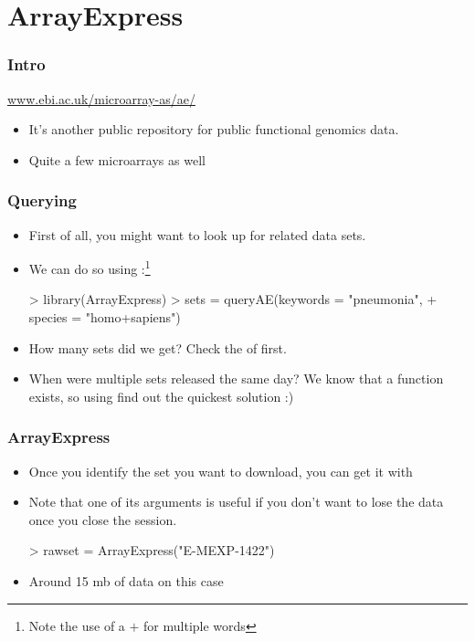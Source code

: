 \section{ArrayExpress}

\begin{frame}[allowframebreaks]
  \frametitle{Intro}
  \url{www.ebi.ac.uk/microarray-as/ae/}
  \begin{itemize}
  \item It's another public repository for public functional genomics data.
  \item Quite a few microarrays as well
  \end{itemize}
\end{frame}

\begin{frame}
  \frametitle{Querying}
  \begin{itemize}
  \item First of all, you might want to look up for related data sets.
  \item We can do so using :\footnote{Note the use of a $+$ for multiple words}
\begin{Schunk}
\begin{Sinput}
> library(ArrayExpress)
> sets = queryAE(keywords = "pneumonia", 
+     species = "homo+sapiens")
\end{Sinput}
\end{Schunk}
  \item How many sets did we get? Check the  of  first.
  \item When were multiple sets released the same day? We know that a  function exists, so using  find out the quickest solution :)
  \end{itemize}
\end{frame}

\begin{frame}
  \frametitle{ArrayExpress}
  \begin{itemize}
  \item Once you identify the set you want to download, you can get it with 
  \item Note that one of its arguments is useful if you don't want to lose the data once you close the  session.
\begin{Schunk}
\begin{Sinput}
> rawset = ArrayExpress("E-MEXP-1422")
\end{Sinput}
\end{Schunk}
  \item Around 15 mb of data on this case
  \end{itemize}
\end{frame}


